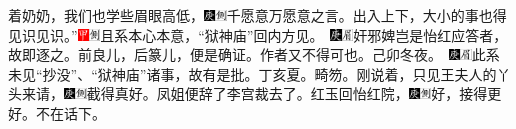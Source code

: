 着奶奶，我们也学些眉眼高低，{\includegraphics[width=3mm]{../Images/00004}\includegraphics[width=3mm]{../Images/00011}\footnotesize \kaishu 千愿意万愿意之言。}出入上下，大小的事也得见识见识。''{\includegraphics[width=3mm]{../Images/00002}\includegraphics[width=3mm]{../Images/00011}\footnotesize \kaishu 且系本心本意，``狱神庙''回内方见。　\includegraphics[width=3mm]{../Images/00004}\includegraphics[width=3mm]{../Images/00010}\footnotesize \kaishu 奸邪婢岂是怡红应答者，故即逐之。前良儿，后篆儿，便是确证。作者又不得可也。己卯冬夜。　\includegraphics[width=3mm]{../Images/00004}\includegraphics[width=3mm]{../Images/00010}\footnotesize \kaishu 此系未见``抄没''、``狱神庙''诸事，故有是批。丁亥夏。畸笏。}刚说着，只见王夫人的丫头来请，{\includegraphics[width=3mm]{../Images/00004}\includegraphics[width=3mm]{../Images/00011}\footnotesize \kaishu 截得真好。}凤姐便辞了李宫裁去了。红玉回怡红院，{\includegraphics[width=3mm]{../Images/00004}\includegraphics[width=3mm]{../Images/00011}\footnotesize \kaishu 好，接得更好。}不在话下。

